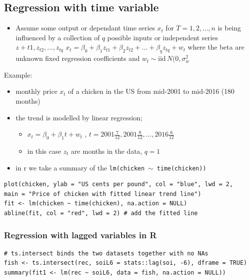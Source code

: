 \documentclass{article}
\begin{document}
\subsection{Regression with time variable}

\begin{itemize}
    \item Assume some output or dependant time series $x_t$ for $T = 1,2, ... ,n$ is being influenced by a collection of $q$ possible inputs or independent series $z+{t1}, z_{t2}, ..., z_{tq}$
    \subitem $x_t = \beta_0 + \beta_1 z_{t1} + \beta_2 z_{t2} + ... + \beta_q z_{tq} + w_t$ where the beta are unknown fixed regression coefficients and $w_t \sim \text{iid} \, N(0,\sigma_w^2$
\end{itemize}

\noindent Example:
\begin{itemize}
    \item monthly price $x_t$ of a chicken in the US from mid-2001 to mid-2016 (180 months)
    \item the trend is modelled by linear regression;
    \begin{itemize}
        \item $x_t = \beta_0 + \beta_1 t + w_t$ , $ t = 2001 \frac{7}{12}, 2001 \frac{8}{12}, ..., 2016 \frac{6}{12}$
        \item in this case $z_t$ are months in the data, $q = 1$
    \end{itemize}
    \item in r we take a summary of the \texttt{lm(chicken $\sim$ time(chicken))}
\end{itemize}

\begin{lstlisting}
plot(chicken, ylab = "US cents per pound", col = "blue", lwd = 2,
main = "Price of chicken with fitted linear trend line")
fit <- lm(chicken ~ time(chicken), na.action = NULL)
abline(fit, col = "red", lwd = 2) # add the fitted line
\end{lstlisting}

\subsubsection{Regression with lagged variables in R}
\begin{lstlisting}
# ts.intersect binds the two datasets together with no NAs
fish <- ts.intersect(rec, soiL6 = stats::lag(soi, -6), dframe = TRUE)
summary(fit1 <- lm(rec ~ soiL6, data = fish, na.action = NULL))
\end{lstlisting}
\end{document}
